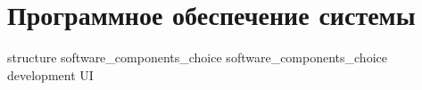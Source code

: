 \section{Программное обеспечение системы}

{structure}
{software_components_choice}
{software_components_choice}
{development}
{UI}

\newpage
